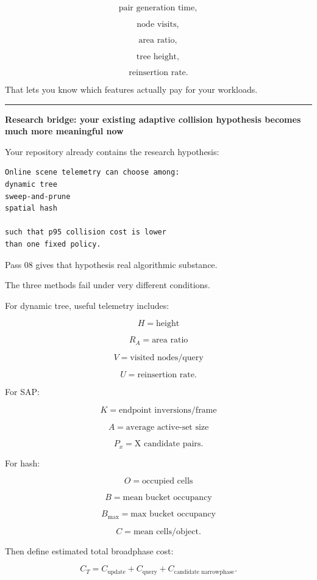 \[
\text{pair generation time},
\]

\[
\text{node visits},
\]

\[
\text{area ratio},
\]

\[
\text{tree height},
\]

\[
\text{reinsertion rate}.
\]

That lets you know which features actually pay for your workloads.

\begin{center}\rule{0.5\linewidth}{0.5pt}\end{center}

\textbf{Research bridge: your existing adaptive collision hypothesis becomes much more meaningful now}

Your repository already contains the research hypothesis:

\begin{verbatim}
Online scene telemetry can choose among:
dynamic tree
sweep-and-prune
spatial hash

such that p95 collision cost is lower
than one fixed policy.
\end{verbatim}

Pass 08 gives that hypothesis real algorithmic substance.

The three methods fail under very different conditions.

For dynamic tree, useful telemetry includes:

\[
H=\text{height}
\]

\[
R_A=\text{area ratio}
\]

\[
V=\text{visited nodes/query}
\]

\[
U=\text{reinsertion rate}.
\]

For SAP:

\[
K=\text{endpoint inversions/frame}
\]

\[
A=\text{average active-set size}
\]

\[
P_x=\text{X candidate pairs}.
\]

For hash:

\[
O=\text{occupied cells}
\]

\[
B=\text{mean bucket occupancy}
\]

\[
B_{\max}=\text{max bucket occupancy}
\]

\[
C=\text{mean cells/object}.
\]

Then define estimated total broadphase cost:

\[
C_T
=
C_{\text{update}}
+
C_{\text{query}}
+
C_{\text{candidate narrowphase}}.
\]

